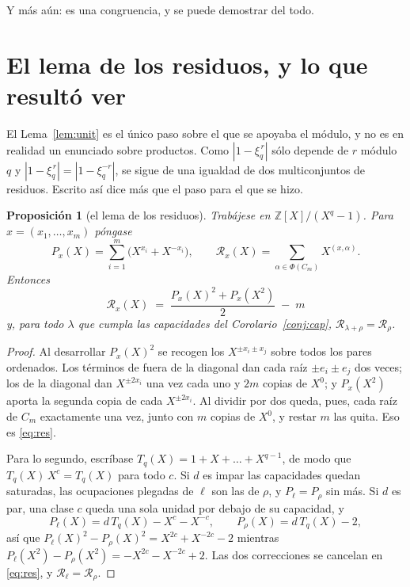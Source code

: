 \documentclass[11pt,a4paper]{article}
\newtheorem{proposition}[theorem]{Proposición}
\begin{document}
\smallskip
\noindent Y más aún: es una congruencia, y se puede demostrar del todo.

\section{El lema de los residuos, y lo que resultó ver}\label{sec:res}

\noindent El Lema~\ref{lem:unit} es el único paso sobre el que se apoyaba el módulo, y no es en
realidad un enunciado sobre productos. Como $|1-\xi_q^{\,r}|$ sólo depende de $r$ módulo $q$ y
$|1-\xi_q^{\,r}|=|1-\xi_q^{-r}|$, se sigue de una igualdad de dos multiconjuntos de residuos.
Escrito así dice más que el paso para el que se hizo.

\begin{proposition}[el lema de los residuos]\label{prop:res}
Trabájese en $\mathbb{Z}[X]/(X^q-1)$. Para $x=(x_1,\dots,x_m)$ póngase
\[
P_x(X)=\sum_{i=1}^{m}\bigl(X^{x_i}+X^{-x_i}\bigr),
\qquad
\mathscr{R}_x(X)=\sum_{\alpha\in\Phi(C_m)}X^{(x,\alpha)} .
\]
Entonces
\begin{equation}\label{eq:res}
\boxed{\;\mathscr{R}_x(X)\;=\;\frac{P_x(X)^2+P_x(X^2)}{2}\;-\;m\;}
\end{equation}
y, para todo $\lambda$ que cumpla las capacidades del Corolario~\ref{conj:cap},
$\mathscr{R}_{\lambda+\rho}=\mathscr{R}_\rho$.
\end{proposition}

\begin{proof}
Al desarrollar $P_x(X)^2$ se recogen los $X^{\pm x_i\pm x_j}$ sobre todos los pares ordenados. Los
términos de fuera de la diagonal dan cada raíz $\pm e_i\pm e_j$ dos veces; los de la diagonal dan
$X^{\pm2x_i}$ una vez cada uno y $2m$ copias de $X^0$; y $P_x(X^2)$ aporta la segunda copia de cada
$X^{\pm2x_i}$. Al dividir por dos queda, pues, cada raíz de $C_m$ exactamente una vez, junto con $m$
copias de $X^0$, y restar $m$ las quita. Eso es \eqref{eq:res}.

Para lo segundo, escríbase $T_q(X)=1+X+\dots+X^{q-1}$, de modo que $T_q(X)\,X^{c}=T_q(X)$ para todo
$c$. Si $d$ es impar las capacidades quedan saturadas, las ocupaciones plegadas de $\ell$ son las de
$\rho$, y $P_\ell=P_\rho$ sin más. Si $d$ es par, una clase $c$ queda una sola unidad por debajo de
su capacidad, y
\[
P_\ell(X)=d\,T_q(X)-X^{c}-X^{-c},\qquad P_\rho(X)=d\,T_q(X)-2 ,
\]
así que $P_\ell(X)^2-P_\rho(X)^2=X^{2c}+X^{-2c}-2$ mientras
$P_\ell(X^2)-P_\rho(X^2)=-X^{2c}-X^{-2c}+2$. Las dos correcciones se cancelan en \eqref{eq:res}, y
$\mathscr{R}_\ell=\mathscr{R}_\rho$.
\end{proof}
\end{document}
